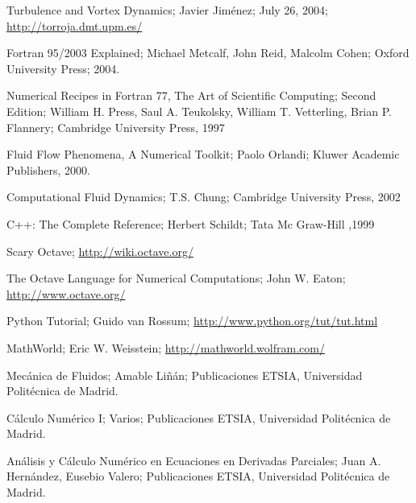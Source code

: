 \documentclass[10pt,fleqn,a4]{book}
\begin{document}
\begin{thebibliography}{99}


  Turbulence and Vortex Dynamics; Javier Jiménez; July 26, 2004;
  \url{http://torroja.dmt.upm.es/}


  Fortran 95/2003 Explained; Michael Metcalf, John Reid, Malcolm
  Cohen; Oxford University Press; 2004.


  Numerical Recipes in Fortran 77, The Art of Scientific Computing;
  Second Edition; William H. Press, Saul A. Teukolsky, William T.
  Vetterling, Brian P. Flannery; Cambridge University Press, 1997


  Fluid Flow Phenomena, A Numerical Toolkit; Paolo Orlandi; Kluwer
  Academic Publishers, 2000.


  Computational Fluid Dynamics; T.S. Chung; Cambridge University
  Press, 2002


  C++: The Complete Reference; Herbert Schildt; Tata Mc Graw-Hill
  ,1999


  Scary Octave; \url{http://wiki.octave.org/}


  The Octave Language for Numerical Computations; John W. Eaton;
  \url{http://www.octave.org/}


  Python Tutorial; Guido van Rossum;
  \url{http://www.python.org/tut/tut.html}


  MathWorld; Eric W. Weisstein; \url{http://mathworld.wolfram.com/}


  Mecánica de Fluidos; Amable Liñán; Publicaciones ETSIA, Universidad
  Politécnica de Madrid.


  Cálculo Numérico I; Varios; Publicaciones ETSIA, Universidad
  Politécnica de Madrid.


  Análisis y Cálculo Numérico en Ecuaciones en Derivadas Parciales;
  Juan A. Hernández, Eusebio Valero; Publicaciones ETSIA, Universidad
  Politécnica de Madrid.


\end{thebibliography}
\end{document}
